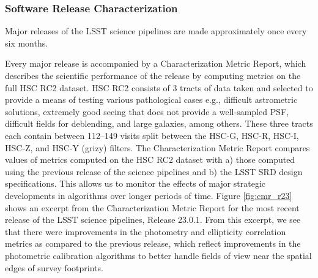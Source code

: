\subsubsection{Software Release Characterization } \label{sssec:characterization}

Major releases of the LSST science pipelines are made approximately once every six months. 

Every major release is accompanied by a Characterization Metric Report, which describes the scientific performance of the release by computing \faro metrics on the full HSC RC2 dataset. 
HSC RC2 consists of 3 tracts of data taken and selected to provide a means of testing various pathological cases e.g., difficult astrometric solutions, extremely good seeing that does not provide a well-sampled PSF, difficult fields for deblending, and large galaxies, among others. 
These three tracts each contain between 112--149 visits split between the HSC-G, HSC-R, HSC-I, HSC-Z, and HSC-Y (grizy) filters.
The Characterization Metric Report compares values of metrics computed on the HSC RC2 dataset with a) those computed using the previous release of the science pipelines and b) the LSST SRD design specifications. 
This allows us to monitor the effects of major strategic developments in algorithms over longer periods of time. 
Figure \ref{fig:cmr_r23} shows an excerpt from the Characterization Metric Report \cite{dmtr-351} for the most recent release of the LSST science pipelines, Release 23.0.1.
From this excerpt, we see that there were improvements in the photometry and ellipticity correlation metrics as compared to the previous release, which reflect improvements in the photometric calibration algorithms to better handle fields of view near the spatial edges of survey footprints. 
